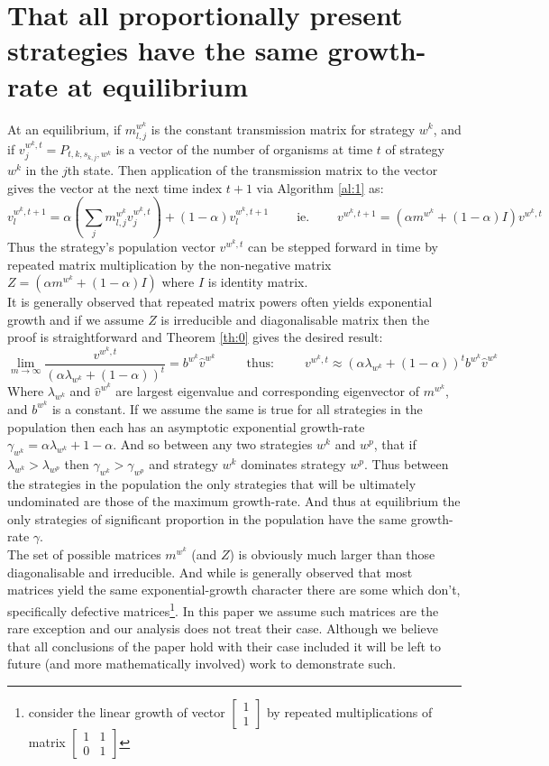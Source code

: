 \section{That all proportionally present strategies have the same growth-rate at equilibrium}\label{appendix1}
At an equilibrium, if $m^{w^k}_{l,j}$ is the constant transmission matrix for strategy $w^k$, and if $v^{w^k,t}_j=P_{t,k,s_{k,j},w^k}$ is a vector of the number of organisms at time $t$ of strategy $w^k$ in the $j$th state.
Then application of the transmission matrix to the vector gives the vector at the next time index $t+1$ via Algorithm \ref{al:1} as:
$$ v^{w^k,t+1}_l=\alpha\left(\sum_jm^{w^k}_{l,j}v^{w^k,t}_j\right) + (1-\alpha)v^{w^k,t+1}_l ~~~~~~~~~~\text{ie.}~~~~~~~~~~v^{w^k,t+1} = \left(\alpha m^{w^k} + (1-\alpha)I\right)v^{w^k,t}$$
Thus the strategy's population vector $v^{w^k,t}$ can be stepped forward in time by repeated matrix multiplication by the non-negative matrix $Z = (\alpha m^{w^k} + (1-\alpha)I)$ where $I$ is identity matrix.\\
It is generally observed that repeated matrix powers often yields exponential growth and if we assume $Z$ is irreducible and diagonalisable matrix then the proof is straightforward and Theorem \ref{th:0} gives the desired result:
\begin{equation}\label{eq:growth}\lim_{m\rightarrow\infty}\frac{v^{w^k,t}}{(\alpha\lambda_{w^k}+(1-\alpha))^t}=b^{w^k}\hat{v}^{w^k}~~~~~~~~~~~\text{thus:}~~~~~~~~~~~v^{w^k,t}\approx(\alpha\lambda_{w^k}+(1-\alpha))^tb^{w^k}\hat{v}^{w^k}\end{equation}
Where $\lambda_{w^k}$ and $\hat{v}^{w^k}$ are largest eigenvalue and corresponding eigenvector of $m^{w^k}$, and $b^{w^k}$ is a constant.
If we assume the same is true for all strategies in the population then each has an asymptotic exponential growth-rate $\gamma_{w^k}=\alpha\lambda_{w^k}+1-\alpha$.
And so between any two strategies $w^k$ and $w^p$, that if $\lambda_{w^k}>\lambda_{w^p}$ then $\gamma_{w^k}>\gamma_{w^p}$ and strategy $w^k$ dominates strategy $w^p$.
Thus between the strategies in the population the only strategies that will be ultimately undominated are those of the maximum growth-rate.
And thus at equilibrium the only strategies of significant proportion in the population have the same growth-rate $\gamma$.
\\

The set of possible matrices $m^{w^k}$ (and $Z$) is obviously much larger than those diagonalisable and irreducible. And while is generally observed that most matrices yield the same exponential-growth character there are some which don't, specifically defective matrices\footnote{consider the linear growth of vector $\begin{bmatrix}1\\1\end{bmatrix}$ by repeated multiplications of matrix $\begin{bmatrix}1 & 1\\0 & 1\end{bmatrix} $}. In this paper we assume such matrices are the rare exception and our analysis does not treat their case. Although we believe that all conclusions of the paper hold with their case included it will be left to future (and more mathematically involved) work to demonstrate such.

